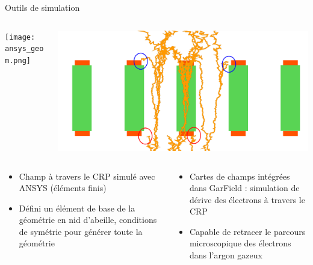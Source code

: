     \begin{frame}{Outils de simulation}
        \begin{scriptsize}
            \begin{columns}
                \begin{column}{0.5\textwidth}
                    \texttt{[image: ansys\_geom.png]}
                \end{column}\hfill
                \begin{column}{0.5\textwidth}
                    \includegraphics[width=\textwidth]{./pictures/losses_with_lem.png}
                \end{column}
            \end{columns}
            \begin{columns}
                \begin{column}{0.5\textwidth}
                    \begin{itemize}
                        \item Champ à travers le CRP simulé avec ANSYS (éléments finis)
                        \item Défini un élément de base de la géométrie en nid d'abeille, conditions de symétrie pour générer toute la géométrie
                    \end{itemize}
                \end{column}
                \begin{column}{0.5\textwidth}
                    \begin{itemize}
                        \item Cartes de champs intégrées dans GarField : simulation de dérive des électrons à travers le CRP
                        \item Capable de retracer le parcours microscopique des électrons dans l'argon gazeux
                    \end{itemize}
                \end{column}
            \end{columns}
        \end{scriptsize}
    \end{frame}
    

